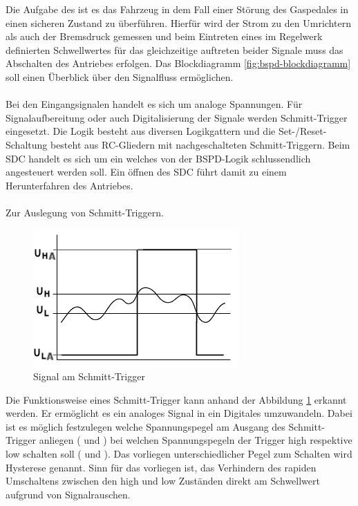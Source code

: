 Die Aufgabe des  ist es das Fahrzeug in dem Fall einer Störung des Gaspedales in einen sicheren Zustand zu überführen. Hierfür wird der Strom zu den Umrichtern als auch der Bremsdruck gemessen und beim Eintreten eines im Regelwerk definierten Schwellwertes für das gleichzeitige auftreten beider Signale muss das Abschalten des Antriebes erfolgen. Das Blockdiagramm \ref{fig:bspd-blockdiagramm} soll einen Überblick über den Signalfluss ermöglichen.\\
\\
Bei den Eingangsignalen handelt es sich um analoge Spannungen. Für Signalaufbereitung oder auch Digitalisierung der Signale werden Schmitt-Trigger eingesetzt. Die Logik besteht aus diversen Logikgattern und die Set-/Reset-Schaltung besteht aus RC-Gliedern mit nachgeschalteten Schmitt-Triggern. Beim \ac{SDC} handelt es sich um ein  welches von der \ac{BSPD}-Logik schlussendlich angesteuert werden soll. Ein öffnen des \ac{SDC} führt damit zu einem Herunterfahren des Antriebes.\\
\\
Zur Auslegung von Schmitt-Triggern.
\begin{figure}
	\centering
	\includegraphics[width=0.4\linewidth]{bilder/Schmitt-trigger-diagramm.png}
	\caption{Signal am Schmitt-Trigger \cite{SchmittTriggerMikrocontrollernet}}
	\label{fig:schmitt-trigger-diagramm}
\end{figure}

Die Funktionsweise eines Schmitt-Trigger kann anhand der Abbildung \ref{fig:schmitt-trigger-diagramm} erkannt werden. Er ermöglicht es ein analoges Signal in ein Digitales umzuwandeln. Dabei ist es möglich festzulegen welche Spannungspegel am Ausgang des Schmitt-Trigger anliegen ( und ) bei welchen Spannungspegeln der Trigger high respektive low schalten soll ( und ). Das vorliegen unterschiedlicher Pegel zum Schalten wird Hysterese genannt. Sinn für das vorliegen ist, das Verhindern des rapiden Umschaltens zwischen den high und low Zuständen direkt am Schwellwert aufgrund von Signalrauschen.


